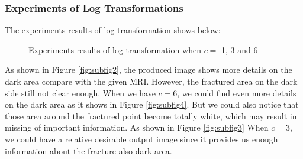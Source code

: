 \subsubsection{Experiments of Log Transformations}
The experiments results of log transformation shows below:
\begin{figure}[h]
	\centering
	\label{fig:exlogfig}
	\caption{Experiments results of log transformation when $c=$ 1, 3 and 6}
\end{figure}
As shown in Figure \ref{fig:subfig2}, the produced image shows more details on the dark area compare with the given MRI. However, the fractured area on the dark side still not clear enough. When we have $c=6$, we could find even more details on the dark area as it shows in Figure \ref{fig:subfig4}. But we could also notice that those area around the fractured point become totally white, which may result in missing of important information. As shown in Figure \ref{fig:subfig3} When $c=3$, we could have a relative desirable output image since it provides us enough information about the fracture also dark area. 

